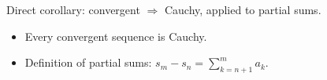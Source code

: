 \begin{remark*}
Direct corollary: convergent $\Rightarrow$ Cauchy, applied to partial sums.
\end{remark*}

\begin{remark*}[Dependencies]
\begin{itemize}
  \item Every convergent sequence is Cauchy.
  \item Definition of partial sums: $s_m - s_n = \sum_{k=n+1}^m a_k$.
\end{itemize}
\end{remark*}
